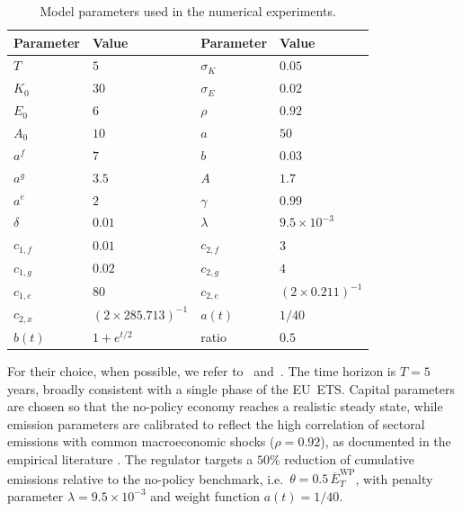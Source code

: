 \documentclass[11pt,twoside]{amsart}
\theoremstyle{definition}
\numberwithin{equation}{section}
\renewcommand{\bar}{\overline}
\begin{document}
{\footnotesize{
\begin{table}[htb!]
\centering
\caption{\footnotesize{Model parameters used in the numerical experiments.}}
\label{tab:params}
\begin{tabular}{llll}
\toprule
Parameter & Value & Parameter & Value \\
\midrule
$T$            & $5$               & $\sigma_K$    & $0.05$                        \\
$K_0$          & $30$              & $\sigma_E$    & $0.02$                        \\
$E_0$          & $6$               & $\rho$        & $0.92$                        \\
$A_0$          & $10$              & $a$           & $50$                          \\
$a^f$          & $7$               & $b$           & $0.03$                        \\
$a^g$          & $3.5$             & $A$           & $1.7$                         \\
$a^e$          & $2$               & $\gamma$      & $0.99$                        \\
$\delta$       & $0.01$            & $\lambda$     & $9.5\times10^{-3}$            \\
$c_{1,f}$      & $0.01$            & $c_{2,f}$     & $3$                           \\
$c_{1,g}$      & $0.02$            & $c_{2,g}$     & $4$                           \\
$c_{1,e}$      & $80$              & $c_{2,e}$     & $(2\times 0.211)^{-1}$        \\
$c_{2,x}$      & $(2\times285.713)^{-1}$ & $a(t)$ & $1/40$                   \\
$b(t)$         & $1 + e^{t/2}$     & ratio         & $0.5$                         \\
\bottomrule
\end{tabular}
\end{table}
}}

For their choice, when possible, we refer to~\cite{aid2023optimal} and~\cite{del2024mean}. The time horizon is
$T = 5$ years, broadly consistent with a single phase of the EU~ETS. Capital
parameters are chosen so that the no-policy economy reaches a realistic steady state,
while emission parameters are calibrated to reflect the high correlation of sectoral
emissions with common macroeconomic shocks ($\rho = 0.92$), as documented in the
empirical literature \cite{aid2023optimal}. The regulator targets a $50\%$ reduction of
cumulative emissions relative to the no-policy benchmark, i.e.\ $\theta = 0.5\,
\bar{E}^{\mathrm{WP}}_T$, with penalty parameter $\lambda = 9.5 \times 10^{-3}$ and
weight function $a(t) = 1/40$.
\end{document}
